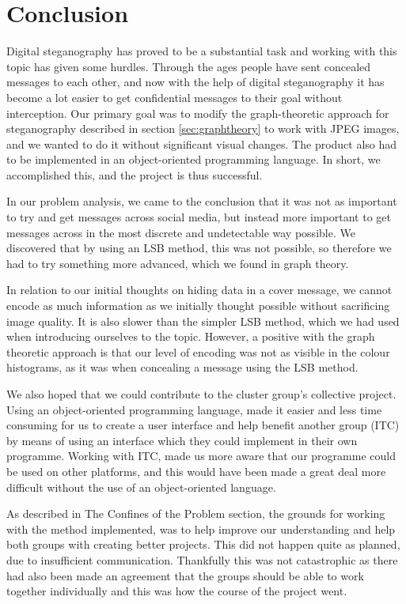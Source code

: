 \section{Conclusion}
Digital steganography has proved to be a substantial task and working with this topic has given some hurdles. 
Through the ages people have sent concealed messages to each other, and now with the help of digital steganography it has become a lot easier to get confidential messages to their goal without interception.
Our primary goal was to modify the graph-theoretic approach for steganography described in section \ref{sec:graphtheory} to work with JPEG images, and we wanted to do it without significant visual changes.
The product also had to be implemented in an object-oriented programming language.
In short, we accomplished this, and the project is thus successful.

In our problem analysis, we came to the conclusion that it was not as important to try and get messages across social media, but instead more important to get messages across in the most discrete and undetectable way possible. 
We discovered that by using an LSB method, this was not possible, so therefore we had to try something more advanced, which we found in graph theory.
 
In relation to our initial thoughts on hiding data in a cover message, we cannot encode as much information as we initially thought possible without sacrificing image quality. 
It is also slower than the simpler LSB method, which we had used when introducing ourselves to the topic.
However, a positive with the graph theoretic approach is that our level of encoding was not as visible in the colour histograms, as it was when concealing a message using the LSB method.

We also hoped that we could contribute to the cluster group's collective project.
Using an object-oriented programming language, made it easier and less time consuming for us to create a user interface and help benefit another group (ITC) by means of using an interface which they could implement in their own programme. 
Working with ITC, made us more aware that our programme could be used on other platforms, and this would have been made a great deal more difficult without the use of an object-oriented language.

As described in The Confines of the Problem section, the grounds for working with the method implemented, was to help improve our understanding and help both groups with creating better projects. 
This did not happen quite as planned, due to insufficient communication. Thankfully this was not catastrophic as there had also been made an agreement that the groups should be able to work together individually and this was how the course of the project went.

